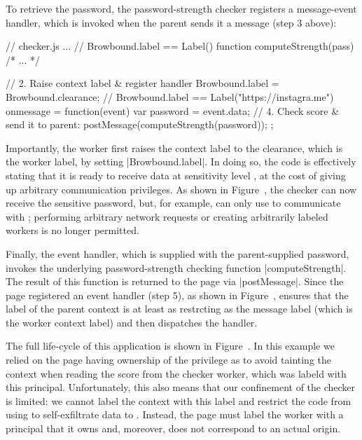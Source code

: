 To retrieve the password, the password-strength checker registers a
message-event handler, which is invoked when the parent sends it a
message (step 3 above):
\begin{jscode}
// checker.js ...
// Browbound.label == Label()
function computeStrength(pass) { /* ... */ }

// 2. Raise context label & register handler
Browbound.label = Browbound.clearance;
// Browbound.label == Label("https://instagra.me")
onmessage = function(event) {
  var password = event.data;
  // 4. Check score & send it to parent:
  postMessage(computeStrength(password));
};
\end{jscode}
%
Importantly, the worker first raises the context label to the
clearance, which is the worker label, by setting \js|Browbound.label|.
%
In doing so, the code is effectively stating that it is ready to
receive data at sensitivity level , at the cost of
giving up arbitrary communication privileges.
%
As shown in Figure~, the checker can now receive
the sensitive password, but, for example, can only use \xhr{} to
communicate with ;
%
performing arbitrary network requests or creating arbitrarily labeled
workers is no longer permitted.

Finally, the event handler, which is supplied with the parent-supplied
password, invokes the underlying password-strength checking function
\js|computeStrength|.
%
The result of this function is returned to the page via
\js|postMessage|.
%
Since the page registered an event handler (step 5), as shown in
Figure~, \sys{} ensures that the label of
the parent context is at least as restrcting as the message label
(which is the worker context label) and then dispatches the handler.
 
The full life-cycle of this application is shown in
Figure~.
%
In this example we relied on the page having ownership of the
 privilege as to avoid tainting the context when
reading the score from the checker worker, which was labeld with this
principal.
%
Unfortunately, this also means that our confinement of the checker is
limited: we cannot label the context with this label and restrict the
code from using \xhr{} to self-exfiltrate data to .
%
Instead, the page must label the worker with a principal that it owns
and, moreover, does not correspond to an actual origin.

